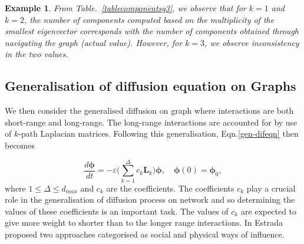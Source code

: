 \documentclass[10pt,a4paper]{article}
\newtheorem{exa}{Example}
\begin{document}
\begin{exa}
    	    	From Table.~\ref{tablecomponentsg3}, we observe that for $k=1$ and $k=2$, the number of components computed based on the multiplicity of the smallest eigenvector corresponds with the number of components obtained through navigating the graph (actual value). However, for $k=3$, we observe inconsistency in the two values.
    	    \end{exa}
    	    
    	    \subsection{Generalisation of diffusion equation on Graphs}
    	    We then consider the generalised diffusion on graph where interactions are both short-range and long-range. The long-range interactions are accounted for by use of $k$-path Laplacian matrices. Following this generalisation, Eqn.\ref{gen-difeqn} then becomes

			\begin{equation}
			\frac{d\boldsymbol{\phi}}{dt} =  -\varepsilon \Big(\sum_{k=1}^{\Delta}c_k\mathbf{L}_{k} \Big) \boldsymbol{\phi}, \quad \boldsymbol{\phi}(0) = \boldsymbol{\phi}_0 ,
			\label{kgen-difeqn}
			\end{equation}
			where $1 \leq \Delta \leq d_{max}$ and $c_k$ are the coefficients.
		    The coefficients $c_k$ play a crucial role in the generalisation of diffusion process on network and so determining the values of these coefficients is an important task. The values of $c_k$ are expected to give more weight to shorter than to the longer range interactions. In \citep{estrada2012path} Estrada proposed two approaches categorised as social and physical ways of influence.
\end{document}

